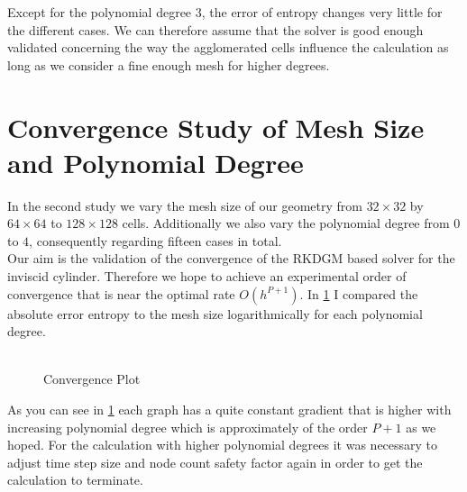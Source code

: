 	Except for the polynomial degree $3$, the error of entropy changes very little for the different cases. We can therefore assume that the solver is good enough validated concerning the way the agglomerated cells influence the calculation as long as we consider a fine enough mesh for higher degrees.
	
	\section{Convergence Study of Mesh Size and Polynomial Degree}
	
	In the second study we vary the mesh size of our geometry from $32 \times 32$ by $64 \times 64$ to $128 \times 128$ cells. Additionally we also vary the polynomial degree from $0$ to $4$, consequently regarding fifteen cases in total. \\
	Our aim is the validation of the convergence of the RKDGM based solver for the inviscid cylinder. Therefore we hope to achieve an experimental order of convergence that is near the optimal rate $O(h^{P+1})$. In  \cref{mesherror} I compared the absolute error entropy to the mesh size logarithmically for each polynomial degree. 	\\\\
	\begin{figure}[htp]
		\centering		
		\caption{Convergence Plot}
		\label{mesherror}
	\end{figure}
	As you can see in \cref{mesherror} each graph has a quite constant gradient that is higher with increasing polynomial degree which is approximately of the order $P+1$ as we hoped. For the calculation with higher polynomial degrees it was necessary to adjust time step size and node count safety factor again in order to get the calculation to terminate. \\ \indent
